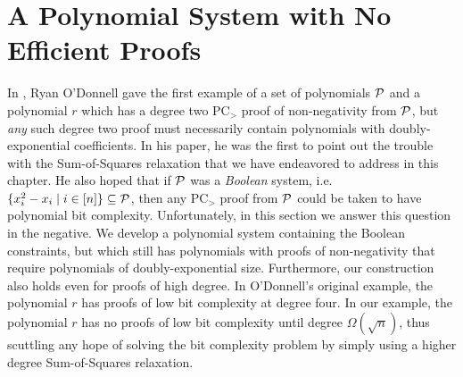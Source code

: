 \section{A Polynomial System with No Efficient Proofs}
In \cite{ODon16}, Ryan O'Donnell gave the first example of a set of polynomials $\mathcal P$ and a polynomial $r$ which has a degree two PC$_>$ proof of non-negativity from $\mathcal P$, but \emph{any} such degree two proof must necessarily contain polynomials with doubly-exponential coefficients. In his paper, he was the first to point out the trouble with the Sum-of-Squares relaxation that we have endeavored to address in this chapter. He also hoped that if $\mathcal P$ was a \emph{Boolean} system, i.e. $\{x_i^2 - x_i \mid i \in [n]\} \subseteq \mathcal P$, then any PC$_>$ proof from $\mathcal P$ could be taken to have polynomial bit complexity. Unfortunately, in this section we answer this question in the negative. We develop a polynomial system containing the Boolean constraints, but which still has polynomials with proofs of non-negativity that require polynomials of doubly-exponential size. Furthermore, our construction also holds even for proofs of high degree. In O'Donnell's original example, the polynomial $r$ has proofs of low bit complexity at degree four. In our example, the polynomial $r$ has no proofs of low bit complexity until degree $\Omega(\sqrt{n})$, thus scuttling any hope of solving the bit complexity problem by simply using a higher degree Sum-of-Squares relaxation.

